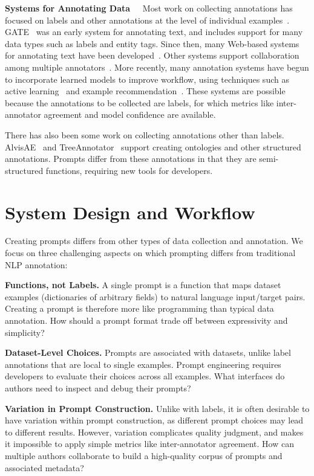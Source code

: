  {\bf Systems for Annotating Data~~} Most work on collecting annotations has focused on labels and other annotations at the level of individual examples~\citep{neves:bioinformatics2021}. GATE~\citep{cunningham2002gate} was an early system for annotating text, and includes support for many data types such as labels and entity tags. Since then, many Web-based systems for annotating text have been developed~\citep{stenetorp:eacl12,saldago:bioinformatics12,wei:nucleicacidsresearch13,yimam:acl13,chen:naacl13,castilho:lt4dh16,putra:lrec20}. Other systems support collaboration among multiple annotators~\citep{yang:acl18,stewart:emnlp19}. More recently, many annotation systems have begun to incorporate learned models to improve workflow, using techniques such as active learning~\citep{lin:acl19,li:naacl21} and example recommendation~\citep{lee:acl20,kiela:naacl21}. These systems are possible because the annotations to be collected are labels, for which metrics like inter-annotator agreement and model confidence are available.

There has also been some work on collecting annotations other than labels. AlvisAE~\citep{papazian:acl12} and TreeAnnotator~\citep{helfrich:lrec18} support creating ontologies and other structured annotations. Prompts differ from these annotations in that they are semi-structured functions, requiring new tools for developers.

\section{System Design and Workflow}

Creating prompts differs from other types of data collection and annotation. We focus on three challenging aspects on which prompting differs from traditional NLP annotation:

\begin{compactitem}
\item \textbf{Functions, not Labels.} A single prompt is a function that maps dataset examples (dictionaries of arbitrary fields) to natural language input/target pairs. Creating a prompt is therefore more like programming than typical data annotation. How should a prompt format trade off between expressivity and simplicity?
\item \textbf{Dataset-Level Choices.} Prompts are associated with datasets, unlike label annotations that are local to single examples. Prompt engineering requires developers to evaluate their choices across all examples. What interfaces do authors need to inspect and debug their prompts?
\item \textbf{Variation in Prompt Construction.} Unlike with labels, it is often desirable to have variation within prompt construction, as different prompt choices may lead to different results. However, variation complicates quality judgment, and makes it impossible to apply simple metrics like inter-annotator agreement. How can multiple authors collaborate to build a high-quality corpus of prompts and associated metadata?
\end{compactitem}

